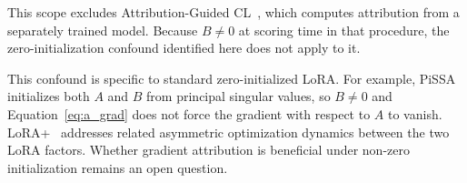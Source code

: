 This scope excludes Attribution-Guided CL~\citep{liu2026attributionguided},
which computes attribution from a separately trained model. Because
$B\neq0$ at scoring time in that procedure, the zero-initialization
confound identified here does not apply to it.

This confound is specific to standard zero-initialized LoRA. For example,
PiSSA~\citep{meng2024pissa} initializes both $A$ and $B$ from principal
singular values, so $B \neq 0$ and Equation~\ref{eq:a_grad} does not
force the gradient with respect to $A$ to vanish. LoRA+~\citep{hayou2024loraplus}
addresses related asymmetric optimization dynamics between the two LoRA
factors. Whether gradient attribution is beneficial under non-zero
initialization remains an open question.




